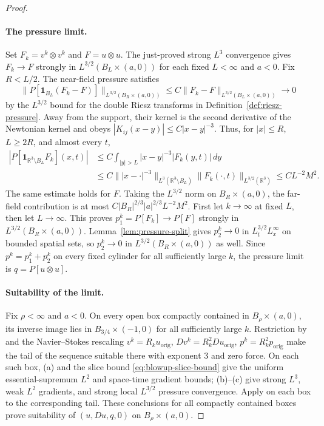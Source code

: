 \documentclass[11pt,letterpaper]{article}
\numberwithin{equation}{section}
\theoremstyle{plain}
\theoremstyle{definition}
\theoremstyle{remark}
\begin{document}
\begin{proof}
\paragraph{The pressure limit.}
Set \(F_k=v^k\otimes v^k\) and \(F=u\otimes u\). The just-proved strong \(L^3\) convergence gives \(F_k\to F\) strongly in \(L^{3/2}(B_L\times(a,0))\) for each fixed \(L<\infty\) and \(a<0\). Fix \(R<L/2\). The near-field pressure satisfies
\begin{equation*}
 \|P[\mathbf1_{B_L}(F_k-F)]\|_{L^{3/2}(B_R\times(a,0))}
 \le C\|F_k-F\|_{L^{3/2}(B_L\times(a,0))}\longrightarrow0
\end{equation*}
by the \(L^{3/2}\) bound for the double Riesz transforms in Definition~\ref{def:riesz-pressure}. Away from the support, their kernel is the second derivative of the Newtonian kernel and obeys \(|K_{ij}(x-y)|\le C|x-y|^{-3}\). Thus, for \(|x|\le R\), \(L\ge2R\), and almost every \(t\),
\begin{align*}
 |P[\mathbf1_{\mathbb R^3\setminus B_L}F_k](x,t)|
 &\le C\int_{|y|>L}|x-y|^{-3}|F_k(y,t)|\,dy\\
 &\le C\bigl\||x-\cdot|^{-3}\bigr\|_{L^3(\mathbb R^3\setminus B_L)}
          \|F_k(\cdot,t)\|_{L^{3/2}(\mathbb R^3)}
 \le C L^{-2}M^2.
\end{align*}
The same estimate holds for \(F\). Taking the \(L^{3/2}\) norm on \(B_R\times(a,0)\), the far-field contribution is at most \(C|B_R|^{2/3}|a|^{2/3}L^{-2}M^2\). First let \(k\to\infty\) at fixed \(L\), then let \(L\to\infty\). This proves \(p_1^k=P[F_k]\to P[F]\) strongly in \(L^{3/2}(B_R\times(a,0))\). Lemma~\ref{lem:pressure-split} gives \(p_2^k\to0\) in \(L^{3/2}_tL^\infty_x\) on bounded spatial sets, so \(p_2^k\to0\) in \(L^{3/2}(B_R\times(a,0))\) as well. Since \(p^k=p_1^k+p_2^k\) on every fixed cylinder for all sufficiently large \(k\), the pressure limit is \(q=P[u\otimes u]\).

\paragraph{Suitability of the limit.}
Fix \(\rho<\infty\) and \(a<0\). On every open box compactly contained in \(B_\rho\times(a,0)\), its inverse image lies in \(B_{3/4}\times(-1,0)\) for all sufficiently large \(k\). Restriction by \cite[Lemma~11.5]{CKNLean} and the Navier--Stokes rescaling \(v^k=R_ku_{\mathrm{orig}}\), \(Dv^k=R_k^2Du_{\mathrm{orig}}\), \(p^k=R_k^2p_{\mathrm{orig}}\) make the tail of the sequence suitable there with exponent \(3\) and zero force. On each such box, (a) and the slice bound \eqref{eq:blowup-slice-bound} give the uniform essential-supremum \(L^2\) and space-time gradient bounds; (b)--(c) give strong \(L^3\), weak \(L^2\) gradients, and strong local \(L^{3/2}\) pressure convergence. Apply \cite[Theorem~11.4]{CKNLean} on each box to the corresponding tail. These conclusions for all compactly contained boxes prove suitability of \((u,Du,q,0)\) on \(B_\rho\times(a,0)\).


\end{proof}
\end{document}
